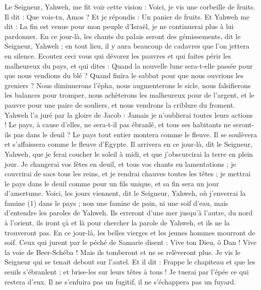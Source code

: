 \begin{multicols}{2}
\VerseOne{}Le Seigneur, Yahweh, me fit voir cette vision : Voici, je vis une corbeille de fruits.
Il dit : Que vois-tu, Amos ? Et je répondis : Un panier de fruits. Et Yahweh me dit : La fin est venue pour mon peuple d'Israël, je ne continuerai plus à lui pardonner.
En ce jour-là, les chants du palais seront des gémissements, dit le Seigneur, Yahweh ; en tout lieu, il y aura beaucoup de cadavres que l'on jettera en silence.
Ecoutez ceci vous qui dévorez les pauvres et qui faites périr les malheureux du pays,
et qui dites : Quand la nouvelle lune sera-t-elle passée pour que nous vendions du blé ? Quand finira le sabbat pour que nous ouvrions les greniers ? Nous diminuerons l’épha, nous augmenterons le sicle, nous falsifierons les balances pour tromper,
nous achèterons les malheureux pour de l’argent, et le pauvre pour une paire de souliers, et nous vendrons la criblure du froment.
Yahweh l’a juré par la gloire de Jacob : Jamais je n’oublierai toutes leurs actions !
Le pays, à cause d’elles, ne sera-t-il pas ébranlé, et tous ses habitants ne seront-ils pas dans le deuil ? Le pays tout entier montera comme le fleuve. Il se soulèvera et s’affaissera comme le fleuve d'Egypte.
Il arrivera en ce jour-là, dit le Seigneur, Yahweh, que je ferai coucher le soleil à midi, et que j’obscurcirai la terre en plein jour.
Je changerai vos fêtes en deuil, et tous vos chants en lamentations ; je couvrirai de sacs tous les reins, et je rendrai chauves toutes les têtes ; je mettrai le pays dans le deuil comme pour un fils unique, et sa fin sera un jour d’amertume.
Voici, les jours viennent, dit le Seigneur, Yahweh, où j'enverrai la famine (1) dans le pays ; non une famine de pain, ni une soif d'eau, mais d’entendre les paroles de Yahweh.
Ils erreront d’une mer jusqu'à l'autre, du nord à l'orient, ils iront çà et là pour chercher la parole de Yahweh, et ils ne la trouveront pas.
En ce jour-là, les belles vierges et les jeunes hommes mourront de soif.
Ceux qui jurent par le péché de Samarie disent : Vive ton Dieu, ô Dan ! Vive la voie de Beer-Schéba ! Mais ils tomberont et ne se relèveront plus.
\VerseOne{}Je vis le Seigneur qui se tenait debout sur l'autel. Et il dit : Frappe le chapiteau et que les seuils s’ébranlent ; et brise-les sur leurs têtes à tous ! Je tuerai par l'épée ce qui restera d'eux. Il ne s’enfuira pas un fugitif, il ne s’échappera pas un fuyard.

\end{multicols}
